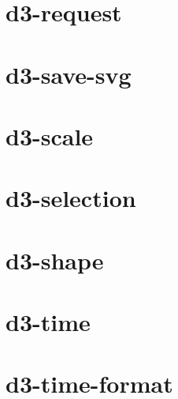 \documentclass[twoside]{book}
\newcommand{\+}{\discretionary{\mbox{\scriptsize$\hookleftarrow$}}{}{}}
\begin{document}
\chapter{d3-\/request}
\label{md_dsmacc_examples_DRmerge_node_modules_d3-request_README}

\chapter{d3-\/save-\/svg}
\label{md_dsmacc_examples_DRmerge_node_modules_d3-save-svg_README}

\chapter{d3-\/scale}
\label{md_dsmacc_examples_DRmerge_node_modules_d3-scale_README}

\chapter{d3-\/selection}
\label{md_dsmacc_examples_DRmerge_node_modules_d3-selection_README}

\chapter{d3-\/shape}
\label{md_dsmacc_examples_DRmerge_node_modules_d3-shape_README}

\chapter{d3-\/time}
\label{md_dsmacc_examples_DRmerge_node_modules_d3-time_README}

\chapter{d3-\/time-\/format}
\label{md_dsmacc_examples_DRmerge_node_modules_d3-time-format_README}

\end{document}
